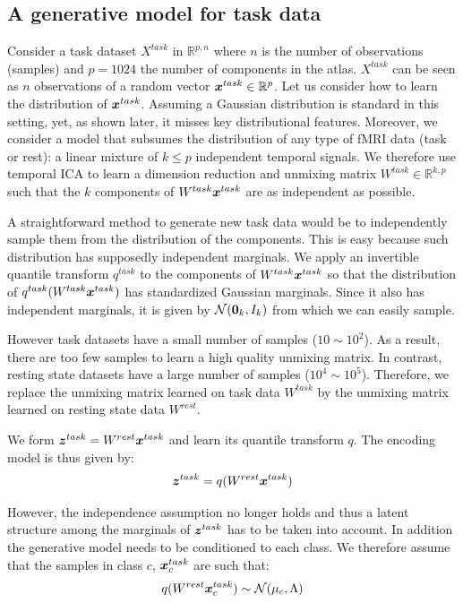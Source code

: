 \subsection{A generative model for task data}
Consider a task dataset $X^{task}$ in $\mathbb{R}^{p,n}$ where $n$ is the number of observations
(samples) and $p=1024$ the number of components in the atlas. $X^{task}$ can be seen as $n$
observations of a random vector $\boldsymbol{x}^{task} \in \mathbb{R}^p$. Let us
consider how to learn the distribution of $\boldsymbol{x}^{task}$. 
%
Assuming a Gaussian distribution is standard in this setting, yet, as
shown later, it misses key distributional features.
%
Moreover, we consider a model that subsumes the distribution of any type of
fMRI data (task or rest): a linear mixture of $k \leq p$ independent temporal signals.
%
We therefore use temporal ICA to learn a dimension reduction and unmixing matrix
$W^{task} \in \mathbb{R}^{k, p}$ such that the $k$ components of
$W^{task} \boldsymbol{x}^{task}$ are as
independent as possible.

A straightforward method to generate new task data would be to
independently sample them from the distribution of the components.
%
This is easy because such distribution has supposedly independent marginals.
We apply an invertible quantile transform $q^{task}$ to the components of $W^{task} \boldsymbol{x}^{task}$ so that
the distribution of $q^{task}(W^{task} \boldsymbol{x}^{task})$ has standardized Gaussian
marginals. Since it also has independent marginals, it is given by $\mathcal{N}({\boldsymbol{0}}_k, I_k)$
from which we can easily sample.

However task datasets   have a small number of samples ($10 \sim 10^2$). As a
result, there are too few samples to learn a high quality unmixing matrix. In
contrast, resting state datasets have a large number of samples ($10^4 \sim 10^5$).
Therefore, we replace the unmixing matrix learned on task data $W^{task}$ by the
unmixing matrix learned on resting state data $W^{rest}$.

We form $\boldsymbol{z}^{task} = W^{rest} \boldsymbol{x}^{task}$ and learn its quantile
transform $q$.
The encoding model is thus given by:
\begin{align}
  \boldsymbol{z}^{task} = q(W^{rest} \boldsymbol{x}^{task})
\end{align}

However, the independence assumption no longer holds and thus a latent structure among the marginals of
$\boldsymbol{z}^{task}$ has to be taken into account. In addition the generative model needs
to be conditioned to each class. We therefore assume that the samples in class
$c$, $\boldsymbol{x}_c^{task}$ are such that:
\begin{align}
q(W^{rest}\boldsymbol{x}^{task}_c) \sim \mathcal{N}( \mu_c, \Lambda)
\end{align}

